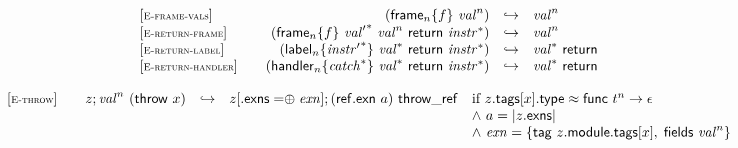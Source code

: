 $$
\begin{array}[t]{@{}lrcl@{}l@{}}
{[\textsc{\scriptsize E{-}frame{-}vals}]} \quad & ({{\mathsf{frame}}_{n}}{\{ f \}}~{{\mathit{val}}^{n}}) & \hookrightarrow & {{\mathit{val}}^{n}} \\
{[\textsc{\scriptsize E{-}return{-}frame}]} \quad & ({{\mathsf{frame}}_{n}}{\{ f \}}~{{\mathit{val}'}^\ast}~{{\mathit{val}}^{n}}~\mathsf{return}~{{\mathit{instr}}^\ast}) & \hookrightarrow & {{\mathit{val}}^{n}} \\
{[\textsc{\scriptsize E{-}return{-}label}]} \quad & ({{\mathsf{label}}_{n}}{\{ {{\mathit{instr}'}^\ast} \}}~{{\mathit{val}}^\ast}~\mathsf{return}~{{\mathit{instr}}^\ast}) & \hookrightarrow & {{\mathit{val}}^\ast}~\mathsf{return} \\
{[\textsc{\scriptsize E{-}return{-}handler}]} \quad & ({{\mathsf{handler}}_{n}}{\{ {{\mathit{catch}}^\ast} \}}~{{\mathit{val}}^\ast}~\mathsf{return}~{{\mathit{instr}}^\ast}) & \hookrightarrow & {{\mathit{val}}^\ast}~\mathsf{return} \\
\end{array}
$$

\vspace{1ex}

$$
\begin{array}[t]{@{}lrcl@{}l@{}}
{[\textsc{\scriptsize E{-}throw}]} \quad & z ; {{\mathit{val}}^{n}}~(\mathsf{throw}~x) & \hookrightarrow & z{}[{.}\mathsf{exns} \mathrel{{=}{\oplus}} {\mathit{exn}}] ; (\mathsf{ref{.}exn}~a)~\mathsf{throw\_ref} & \quad
\begin{array}[t]{@{}l@{}}
\mbox{if}~ z{.}\mathsf{tags}{}[x]{.}\mathsf{type} \approx \mathsf{func}~{t^{n}} \rightarrow \epsilon \\
{\land}~ a = {|z{.}\mathsf{exns}|} \\
{\land}~ {\mathit{exn}} = \{ \mathsf{tag}~z{.}\mathsf{module}{.}\mathsf{tags}{}[x],\;\allowbreak \mathsf{fields}~{{\mathit{val}}^{n}} \} \\
\end{array} \\
\end{array}
$$

